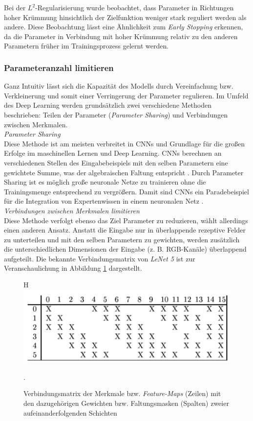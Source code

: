 Bei der $L^2$-Regularisierung wurde beobachtet, dass Parameter in Richtungen hoher Krümmung hinsichtlich der Zielfunktion weniger stark reguliert werden als andere. Diese Beobachtung lässt eine Ähnlichkeit zum \textit{Early Stopping} erkennen, da die Parameter in Verbindung mit hoher Krümmung relativ zu den anderen Parametern früher im Trainingsprozess gelernt werden.

\subsubsection{Parameteranzahl limitieren}
Ganz Intuitiv lässt sich die Kapazität des Modells durch Vereinfachung bzw. Verkleinerung und somit einer Verringerung der Parameter regulieren. Im Umfeld des Deep Learning werden grundsätzlich zwei verschiedene Methoden beschrieben: Teilen der Parameter (\textit{Parameter Sharing}) und Verbindungen zwischen Merkmalen. \\

\textit{Parameter Sharing} \\
Diese Methode ist am meisten verbreitet in CNNs und Grundlage für die großen Erfolge im maschinellen Lernen und Deep Learning. CNNs berechnen an verschiedenen Stellen des Eingabebeispiels mit den selben Parametern eine gewichtete Summe, was der algebraischen Faltung entspricht \cite[vgl.][]{LeCun1998}. 
Durch Parameter Sharing ist es möglich große neuronale Netze zu trainieren ohne die Trainingsmenge entsprechend zu vergrößern. Damit sind CNNs ein Paradebeispiel für die Integration von Expertenwissen in einem neuronalen Netz \cite[vgl.][Kap 7.8, S. 224]{Bengio2015}. \\

\textit{Verbindungen zwischen Merkmalen limitieren} \\
Diese Methode verfolgt ebenso das Ziel Parameter zu reduzieren, wählt allerdings einen anderen Ansatz. Anstatt die Eingabe nur in über\-lapp\-ende rezeptive Felder zu unterteilen und mit den selben Parametern zu gewichten, werden zusätzlich die unterschiedlichen Dimensionen der Eingabe (z. B. RGB-Kanäle) überlappend aufgeteilt. Die bekannte Verbindungsmatrix von \textit{LeNet 5} ist zur Veranschaulichung in Abbildung \ref{fig:4_connections} dargestellt. 

\begin{figure}{H}
\centering
\includegraphics[width=0.4\linewidth]{images/4_connections}
\caption[]{Verbindungsmatrix der Merkmale bzw. \textit{Feature-Maps} (Zeilen) mit den dazugehörigen Gewichten bzw. Faltungsmasken (Spalten) zweier aufeinanderfolgenden Schichten \cite[siehe][]{LeCun1998}}.
\label{fig:4_connections}
\end{figure}

